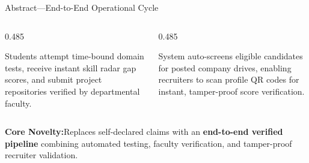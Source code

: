 \documentclass[aspectratio=169,10pt,xcolor={table,dvipsnames}]{beamer}
\begin{document}
\begin{frame}[t]{Abstract\enspace---\enspace End-to-End Operational Cycle}

  \vspace{0.12cm}

  \begin{columns}[T]
    \begin{column}{0.485\textwidth}
      \begin{tcolorbox}[academiccard,title={Phase 1 : Assessment \& Milestone Verification (Nodes 1--5)}]
        \fontsize{6.5}{7.8}\selectfont
        Students attempt time-bound domain tests, receive instant skill radar gap scores, and submit project repositories verified by departmental faculty.
      \end{tcolorbox}
    \end{column}
    \begin{column}{0.485\textwidth}
      \begin{tcolorbox}[academiccard,title={Phase 2 : Drive Matching \& QR Validation (Nodes 6--10)}]
        \fontsize{6.5}{7.8}\selectfont
        System auto-screens eligible candidates for posted company drives, enabling recruiters to scan profile QR codes for instant, tamper-proof score verification.
      \end{tcolorbox}
    \end{column}
  \end{columns}

  \vspace{0.08cm}
  \begin{tcolorbox}[
    enhanced,colback=LightSilver,colframe=BorderColor,
    arc=2pt,boxrule=0.6pt,
    left=6pt,right=6pt,top=2.5pt,bottom=2.5pt]
    \centering\fontsize{6.5}{7.8}\selectfont
    \textbf{\color{Navy}Core Novelty:}\;Replaces self-declared claims with an \textbf{end-to-end verified pipeline} combining automated testing, faculty verification, and tamper-proof recruiter validation.
  \end{tcolorbox}
\end{frame}
\end{document}
